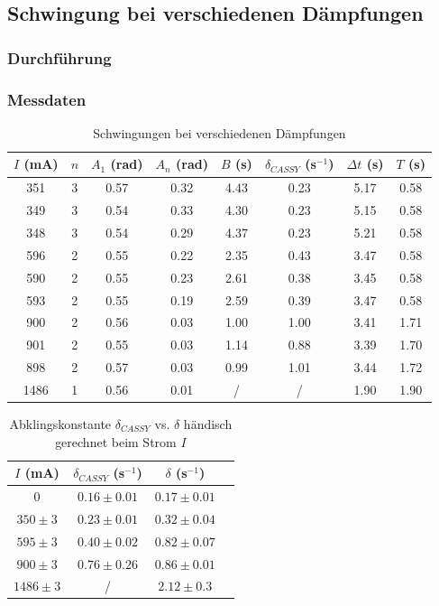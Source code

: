 \documentclass{article}
\begin{document}
\subsection{Schwingung bei verschiedenen Dämpfungen}
\subsubsection{Durchführung}

\subsubsection{Messdaten}
\begin{table}[H]
    \centering
    \begin{tabular}{|c|c|c|c|c|c|c|c|}
    \hline
    $I$ (mA) & $n$ & $A_1$ (rad) & $A_n$ (rad) & $B$ (s) & $\delta_{CASSY}$ (s$^{-1}$) & $\Delta t$ (s) & $T$ (s) \\
    \hline
    351 & 3 & 0.57 & 0.32 & 4.43 & 0.23 & 5.17 & 0.58 \\
    349 & 3 & 0.54 & 0.33 & 4.30 & 0.23 & 5.15 & 0.58 \\
    348 & 3 & 0.54 & 0.29 & 4.37 & 0.23 & 5.21 & 0.58 \\
    596 & 2 & 0.55 & 0.22 & 2.35 & 0.43 & 3.47 & 0.58 \\
    590 & 2 & 0.55 & 0.23 & 2.61 & 0.38 & 3.45 & 0.58 \\
    593 & 2 & 0.55 & 0.19 & 2.59 & 0.39 & 3.47 & 0.58 \\
    900 & 2 & 0.56 & 0.03 & 1.00 & 1.00 & 3.41 & 1.71 \\
    901 & 2 & 0.55 & 0.03 & 1.14 & 0.88 & 3.39 & 1.70 \\
    898 & 2 & 0.57 & 0.03 & 0.99 & 1.01 & 3.44 & 1.72 \\
    1486 & 1 & 0.56 & 0.01 & / & / & 1.90 & 1.90 \\
    \hline
    \end{tabular}
    \caption{Schwingungen bei verschiedenen Dämpfungen}
    \label{tab:schwingung_dämpfungen}
\end{table}

\begin{table}[H]
    \centering
    \begin{tabular}{|c|c|c|c|}
    \hline
    $I$ (mA) & $\delta_{CASSY}$ (s$^{-1}$) & $\delta$ (s$^{-1}$) \\
    \hline
    0 & $0.16 \pm 0.01$ & $0.17 \pm 0.01$ \\
    $350 \pm 3$ & $0.23 \pm 0.01$ & $0.32 \pm 0.04$ \\
    $595 \pm 3$ & $0.40 \pm 0.02$ & $0.82 \pm 0.07$ \\
    $900 \pm 3$ & $0.76 \pm 0.26$ & $0.86 \pm 0.01$ \\
    $1486 \pm 3$ & / & $2.12 \pm 0.3$ \\
    \hline
    \end{tabular}
    \caption{Abklingskonstante $\delta_{CASSY}$ vs. $\delta$ händisch gerechnet beim Strom $I$}
    \label{tab:dämpfungen_strom}
\end{table}
\end{document}
